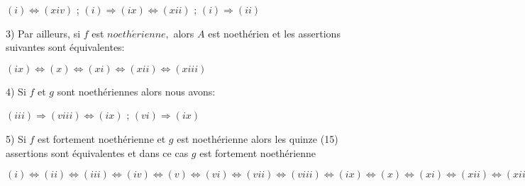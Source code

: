 \begin{montheoreme}
	$(i)\Longleftrightarrow (xiv)$ ; $(i)\Longrightarrow (ix)\Longleftrightarrow
	(xii)$ ; $(i)\Longrightarrow (ii)$
	
	3) Par ailleurs, si $f$ est $noeth\acute{e}rienne,$ alors $A$ est noethérien et les assertions suivantes sont équivalentes:
	
	$(ix)\Longleftrightarrow (x)\Longleftrightarrow (xi)\Longleftrightarrow
	(xii)\Longleftrightarrow (xiii)$
	
	4) Si $f$ et $g$ sont noethériennes alors nous avons:
	
	$(iii)\Longrightarrow (viii)\Longleftrightarrow (ix)$ ; $(vi)\Longrightarrow (ix)$
	
	5) Si $f$ est fortement noethérienne et $g$ est noethérienne alors les quinze (15) assertions sont équivalentes et dans ce cas $g$ est fortement noethérienne
	
	$(i)\Longleftrightarrow (ii)\Longleftrightarrow (iii)\Longleftrightarrow
	(iv)\Longleftrightarrow (v)\Longleftrightarrow (vi)\Longleftrightarrow
	(vii)\Longleftrightarrow (viii)\Longleftrightarrow (ix)\Longleftrightarrow
	(x)\Longleftrightarrow (xi)\Longleftrightarrow (xii)\Longleftrightarrow
	(xiii)\Longleftrightarrow (xiv)\Longleftrightarrow (xv).$
\end{montheoreme}
